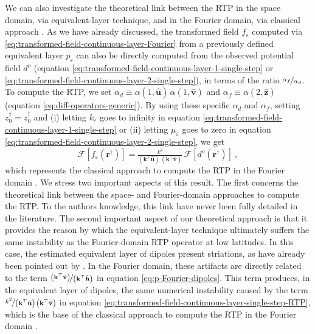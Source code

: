 We can also investigate the theoretical link between the RTP in the space domain, 
via equivalent-layer technique, and in the Fourier domain, via classical approach \citep[e.g., ][ p. 331]{blakely1996}. 
As we have already discussed, the transformed field $f_{\varepsilon}$ computed via \ref{eq:transformed-field-continuous-layer-Fourier} 
from a previously defined equivalent layer $p_{\varepsilon}$ can also be directly 
computed from the observed potential field $d^{o}$ (equation \ref{eq:transformed-field-continuous-layer-1-single-step}
or \ref{eq:transformed-field-continuous-layer-2-single-step}), 
in terms of the ratio $\nicefrac{\alpha_{f}}{\alpha_{d}}$.
To compute the RTP, we set $\alpha_{d} \equiv \alpha(1, \hat{\mathbf{u}}) \, \alpha(1, \hat{\mathbf{v}})$ 
and $\alpha_{f} \equiv \alpha(2, \hat{\mathbf{z}})$ (equation \ref{eq:diff-operators-generic}).
By using these specific $\alpha_{d}$ and $\alpha_{f}$, setting $z^{\ddagger}_{0} = z^{\dagger}_{0}$ and 
(i) letting $k_{\varepsilon}$ goes to infinity in equation \ref{eq:transformed-field-continuous-layer-1-single-step} or
(ii) letting $\mu_{\varepsilon}$ goes to zero in equation \ref{eq:transformed-field-continuous-layer-2-single-step}, we get 
\begin{equation}
	\mathcal{F} [ f_{\varepsilon}(\mathbf{r}^{\dagger}) ] =
	\tfrac{k^{2}}{\left(\mathbf{k}^{\top} \hat{\mathbf{u}} \right) \, \left(\mathbf{k}^{\top} \hat{\mathbf{v}} \right)} \, 
	\mathcal{F} \left[ d^{o}(\mathbf{r}^{\dagger}) \right] \: ,
	\label{eq:transformed-field-continuous-layer-single-step-RTP}
\end{equation}
which represents the
classical approach to compute the RTP in the Fourier domain \citep[e.g., ][ p. 331]{blakely1996}.
We stress two important aspects of this result. The first concerns the theoretical link 
between the space- and Fourier-domain approaches to compute the RTP. To the authors knowledge, this link have never been fully 
detailed in the literature.
The second important aspect of our theoretical approach is that it provides the 
reason by which the equivalent-layer technique ultimately suffers the same instability as 
the Fourier-domain RTP operator at low latitudes. In this case, the estimated equivalent layer of dipoles 
present striations, as have already been pointed out by \citet{li_etal2014}. 
In the Fourier domain, these artifacts are directly related to the term 
$\nicefrac{\left(\mathbf{k}^{\top} \hat{\mathbf{v}} \right)}{\left(\mathbf{k}^{\top} \hat{\mathbf{h}} \right)}$ 
in equation \ref{eq:p-Fourier-dipoles}. This term produces, in the equivalent layer of dipoles, the same 
numerical instability caused by the term 
$\nicefrac{k^{2}}{\left(\mathbf{k}^{\top} \hat{\mathbf{u}} \right) \, \left(\mathbf{k}^{\top} \hat{\mathbf{v}} \right)}$ in equation 
\ref{eq:transformed-field-continuous-layer-single-step-RTP},
which is the base of the classical approach to compute the RTP in the Fourier domain \citep[e.g., ][ p. 331]{blakely1996}.


